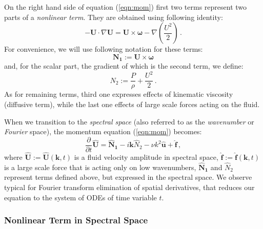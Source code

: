 \documentclass{pracamgren}
\begin{document}
On the right hand side of equation (\ref{eqn:mom}) first two terms represent two parts of a \emph{nonlinear term}. They are obtained using following identity:
$$ - \mathbf{U} \cdot \nabla \mathbf{U} = \mathbf{U} \times \boldsymbol{\omega} - \nabla \left( \frac{U^2}{2} \right) \, . $$
For convenience, we will use following notation for these terms:
$$ \mathbf{N_1} := \mathbf{U} \times \boldsymbol{\omega} $$
and, for the scalar part, the gradient of which is the second term, we define:
$$ N_2 := \frac{P}{\rho} + \frac{U^2}{2} \, . $$
As for remaining terms, third one expresses effects of kinematic viscosity (diffusive term), while the last one effects of large scale forces acting on the fluid.

When we transition to the \emph{spectral space} (also referred to as the \emph{wavenumber} or \emph{Fourier} space), the momentum equation (\ref{eqn:mom}) becomes:
\begin{equation}
\label{eqn:mom-spec}
\frac{\partial}{\partial t} \mathbf{\hat{U}} = \mathbf{\hat{N}_1} - i \mathbf{k} \hat{N}_2 - \nu k^2 \mathbf{\hat{u}} + \mathbf{\hat{f}} \, ,
\end{equation}
where $\mathbf{\hat{U}} := \mathbf{\hat{U}}(\mathbf{k}, t)$ is a fluid velocity amplitude in spectral space, $\mathbf{\hat{f}} := \mathbf{\hat{f}}(\mathbf{k}, t)$ is a large scale force that is acting only on low wavenumbers, $\mathbf{\hat{N}_1}$ and $\hat{N}_2$ represent terms defined above, but expressed in the spectral space.
We observe typical for Fourier transform elimination of spatial derivatives, that reduces our equation to the system of ODEs of time variable $t$. 

\subsubsection{Nonlinear Term in Spectral Space}
\end{document}
